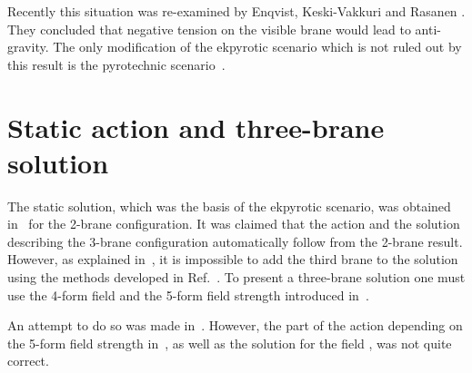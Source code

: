 \documentclass[a4paper,12pt]{article}
\begin{document}
Recently this situation was re-examined by Enqvist, Keski-Vakkuri and Rasanen \cite{Enqvist:2001zk}. They concluded that negative tension  on the visible brane would lead to anti-gravity. The only modification of the ekpyrotic scenario which is not ruled out by this result is the pyrotechnic scenario~\cite{KKL}.


\section{Static action and three-brane solution}

The static solution, which was the basis of the ekpyrotic scenario, was obtained in~\cite{universe} for the 2-brane configuration. It was claimed \cite{KOST,Khoury:2001iy} that the action and the solution describing the 3-brane configuration automatically follow from the 2-brane result. However, as explained in~\cite{KKLT}, it is impossible to add the third brane to the solution  using the methods developed in Ref.~\cite{universe}. To present a three-brane solution one must use the 4-form field \coordHE{} and the 5-form field strength \coordHE{} introduced in~\cite{BKV}.

An attempt to do so was made in~\cite{KOST}. However, the part of the action depending on the 5-form field strength \coordHE{}   in~\cite{KOST},  as well as the solution for the field \coordHE{}, was not quite correct. 
\end{document}
